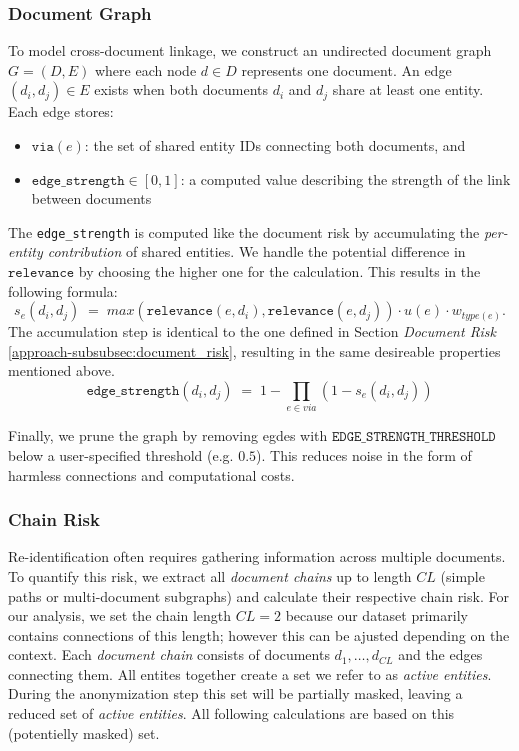 \subsubsection{Document Graph}
To model cross-document linkage, we construct an undirected document graph $G=(D,E)$ where each node $d\in D$ represents one document. An edge $(d_i,d_j)\in E$ exists when both documents $d_i$ and $d_j$ share at least one entity. Each edge stores:
\begin{itemize}
\item $\texttt{via}(e)$: the set of shared entity IDs connecting both documents, and 
\item $\texttt{edge\_strength}\in[0,1]$: a computed value describing the strength of the link between documents
\end{itemize}
The \texttt{edge\_strength} is computed like the document risk by accumulating the \textit{per-entity contribution} of shared entities. We handle the potential difference in $\texttt{relevance}$ by choosing the higher one for the calculation. This results in the following formula:
\[
s_e(d_i, d_j) \; =\; max(\texttt{relevance}(e,d_i), \texttt{relevance}(e,d_j)) \cdot u(e) \cdot w_{type(e)}.
\]
The accumulation step is identical to the one defined in Section \textit{Document Risk} \ref{approach-subsubsec:document_risk}, resulting in the same desireable properties mentioned above.
\[ 
\texttt{edge\_strength}(d_i,d_j) \;=\; 1 - \prod_{e\in{via}}(1 - s_e(d_i,d_j))
\]

Finally, we prune the graph by removing egdes with $\texttt{EDGE\_STRENGTH\_THRESHOLD}$ below a user-specified threshold (e.g. $0.5$). This reduces noise in the form of harmless connections and computational costs. 
\subsubsection{Chain Risk}\label{approach-subsubsec:chain_risk}
Re-identification often requires gathering information across multiple documents. To quantify this risk, we extract all \textit{document chains} up to length $CL$ (simple paths or multi-document subgraphs) and calculate their respective chain risk. For our analysis, we set the chain length $CL=2$ because our dataset primarily contains connections of this length; however this can be ajusted depending on the context. Each \textit{document chain} consists of documents $d_1,\dots,d_{CL}$ and the edges connecting them. All entites together create a set we refer to as \textit{active entities}. During the anonymization step this set will be partially masked, leaving a reduced set of \textit{active entities}. All following calculations are based on this (potentielly masked) set.

